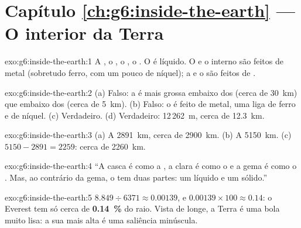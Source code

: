 \section*{Capítulo \ref{ch:g6:inside-the-earth} --- O interior da Terra}

\begin{solution}{exo:g6:inside-the-earth:1}
A , o , o , o . O  é
líquido. O  e o interno são feitos de metal (sobretudo
ferro, com um pouco de níquel); a  e o  são feitos de .
\end{solution}

\begin{solution}{exo:g6:inside-the-earth:2}
(a) Falso: a  é mais grossa embaixo dos  (cerca de 30~km)
que embaixo dos  (cerca de 5~km). (b) Falso: o  é feito de
metal, uma liga de ferro e de níquel. (c) Verdadeiro. (d) Verdadeiro:
12\,262~m, cerca de 12.3~km.
\end{solution}

\begin{solution}{exo:g6:inside-the-earth:3}
(a) A 2891~km, cerca de 2900~km. (b) A 5150~km. (c) $5150 - 2891 = 2259$:
cerca de 2260~km.
\end{solution}

\begin{solution}{exo:g6:inside-the-earth:4}
``A casca é como a \underline{}, a clara é como o \underline{} e
a gema é como o \underline{}. Mas, ao contrário da gema, o
\underline{} tem duas partes: um \underline{} líquido e
um \underline{} sólido.''
\end{solution}

\begin{solution}{exo:g6:inside-the-earth:5}
$8.849 \div 6371 \approx 0.00139$, e $0.00139 \times 100 \approx 0.14$: o
Everest tem só cerca de \textbf{0.14~\%} do raio. Vista de longe, a Terra é
uma bola muito lisa: a sua  mais alta é uma saliência minúscula.
\end{solution}

